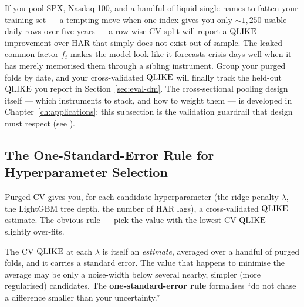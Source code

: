 \begin{projectconnection}
If you pool SPX, Nasdaq-100, and a handful of liquid single names to fatten your training set --- a tempting move when one index gives you only ${\sim}1{,}250$ usable daily rows over five years --- a row-wise CV split will report a $\operatorname{QLIKE}$ improvement over HAR that simply does not exist out of sample.
The leaked common factor $f_t$ makes the model look like it forecasts crisis days well when it has merely memorised them through a sibling instrument.
Group your purged folds by date, and your cross-validated $\operatorname{QLIKE}$ will finally track the held-out $\operatorname{QLIKE}$ you report in Section~\ref{sec:eval-dm}.
The cross-sectional pooling design itself --- which instruments to stack, and how to weight them --- is developed in Chapter~\ref{ch:applications}; this subsection is the validation guardrail that design must respect (see ).
\end{projectconnection}


\subsection{The One-Standard-Error Rule for Hyperparameter Selection}
\label{sec:eval-one-se}

Purged CV gives you, for each candidate hyperparameter (the ridge penalty $\lambda$, the LightGBM tree depth, the number of HAR lags), a cross-validated $\operatorname{QLIKE}$ estimate.
The obvious rule --- pick the value with the lowest CV $\operatorname{QLIKE}$ --- slightly over-fits.

The CV $\operatorname{QLIKE}$ at each $\lambda$ is itself an \emph{estimate}, averaged over a handful of purged folds, and it carries a standard error.
The value that happens to minimise the average may be only a noise-width below several nearby, simpler (more regularised) candidates.
The \textbf{one-standard-error rule} formalises ``do not chase a difference smaller than your uncertainty.''

